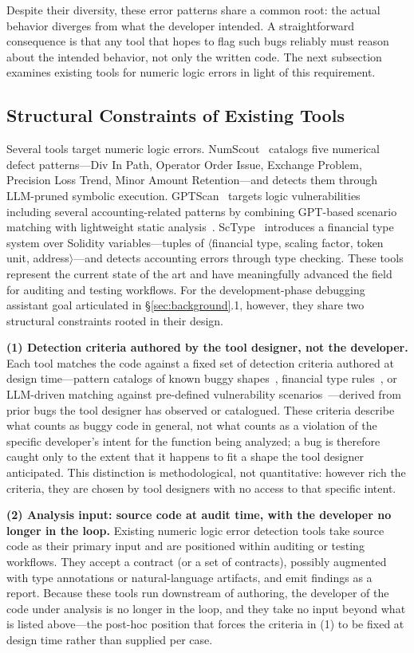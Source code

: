 \documentclass[pdflatex,sn-basic]{sn-jnl}%
\theoremstyle{thmstyleone}%
\theoremstyle{thmstyletwo}%
\theoremstyle{thmstylethree}%
\begin{document}
Despite their diversity, these error patterns share a common root: the actual behavior diverges from what the developer intended.
A straightforward consequence is that any tool that hopes to flag such bugs reliably must reason about the intended behavior, not only the written code.
The next subsection examines existing tools for numeric logic errors in light of this requirement.

\subsection{Structural Constraints of Existing Tools}

Several tools target numeric logic errors.
NumScout~\citep{numscout} catalogs five numerical defect patterns---Div In Path, Operator Order Issue, Exchange Problem, Precision Loss Trend, Minor Amount Retention---and detects them through LLM-pruned symbolic execution.
GPTScan~\citep{gptscan} targets logic vulnerabilities including several accounting-related patterns by combining GPT-based scenario matching with lightweight static analysis~\citep{slither}.
ScType~\citep{sctype} introduces a financial type system over Solidity variables---tuples of $\langle$financial type, scaling factor, token unit, address$\rangle$---and detects accounting errors through type checking.
These tools represent the current state of the art and have meaningfully advanced the field for auditing and testing workflows.
For the development-phase debugging assistant goal articulated in §\ref{sec:background}.1, however, they share two structural constraints rooted in their design.

\smallskip
\noindent\textbf{(1) Detection criteria authored by the tool designer, not the developer.}
Each tool matches the code against a fixed set of detection criteria authored at design time---pattern catalogs of known buggy shapes~\citep{numscout}, financial type rules~\citep{sctype}, or LLM-driven matching against pre-defined vulnerability scenarios~\citep{gptscan}---derived from prior bugs the tool designer has observed or catalogued.
These criteria describe what counts as buggy code in general, not what counts as a violation of the specific developer's intent for the function being analyzed; a bug is therefore caught only to the extent that it happens to fit a shape the tool designer anticipated.
This distinction is methodological, not quantitative: however rich the criteria, they are chosen by tool designers with no access to that specific intent.

\smallskip
\noindent\textbf{(2) Analysis input: source code at audit time, with the developer no longer in the loop.}
Existing numeric logic error detection tools take source code as their primary input and are positioned within auditing or testing workflows.
They accept a contract (or a set of contracts), possibly augmented with type annotations or natural-language artifacts, and emit findings as a report.
Because these tools run downstream of authoring, the developer of the code under analysis is no longer in the loop, and they take no input beyond what is listed above---the post-hoc position that forces the criteria in (1) to be fixed at design time rather than supplied per case.
\end{document}
